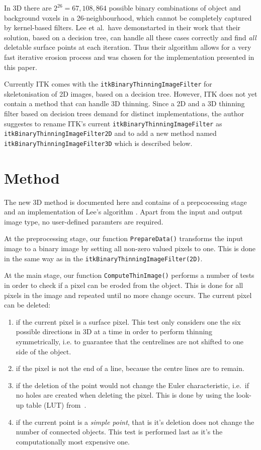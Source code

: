 \documentclass{InsightArticle}
\begin{document}
In 3D there are $2^{26} = 67,108,864$ possible binary combinations of object and background voxels in a 26-neighbourhood, which cannot be completely captured by kernel-based filters. 
Lee et al.~have demonstarted in their work  \cite{lee1994bsm} that their solution, based on a decision tree, can handle all these cases correctly and find \textit{all} deletable surface points at each iteration. Thus their algorithm allows for a very fast iterative erosion process and was chosen for the implementation presented in this paper.

Currently ITK comes with the \texttt{itkBinaryThinningImageFilter} for skeletonisation of 2D images, based on a decision tree. However, ITK does not yet contain a method that can handle 3D thinning.
Since a 2D and a 3D thinning filter based on decision trees demand for distinct implementations, the author suggestes to rename ITK's current \texttt{itkBinaryThinningImageFilter} as \texttt{itkBinaryThinningImageFilter2D} and to add a new method named \texttt{itkBinaryThinningImageFilter3D} which is described below.

\section{Method}
The new 3D method is documented here and contains of a prepcocessing stage and an implementation of Lee's algorithm \cite{lee1994bsm}. Apart from the input and output image type, no user-defined paramters are required.

At the preprocessing stage, our function \texttt{PrepareData()} transforms the input image to a binary image by setting all non-zero valued pixels to one. This is done in the same way as in the \texttt{itkBinaryThinningImageFilter(2D)}.

At the main stage, our function \texttt{ComputeThinImage()} performs a number of tests in order to check if a pixel can be eroded from the object. This is done for all pixels in the image and repeated until no more change occurs. The current pixel can be deleted:

\begin{enumerate}
	\item if the current pixel is a surface pixel. This test only considers one the six possible directions in 3D at a time in order to perform thinning symmetrically, i.e. to guarantee that the centrelines are not shifted to one side of the object.
	\item if the pixel is not the end of a line, because the centre lines are to remain.
	\item if the deletion of the point would not change the Euler characteristic, i.e.~if no holes are created when deleting the pixel. This is done by using the look-up table (LUT) from~\cite{lee1994bsm}.
	\item if the current point is a \textsl{simple point}, that is it's deletion does not change the number of connected objects. This test is performed last as it's the computationally most expensive one.
\end{enumerate}
\end{document}
